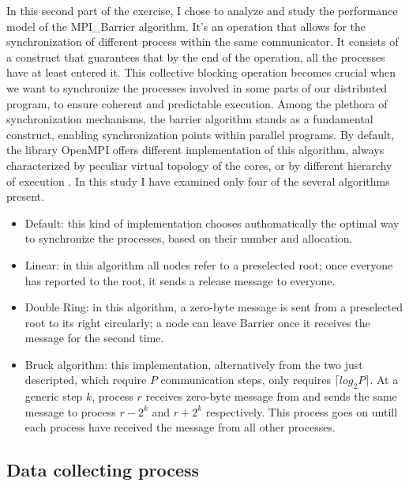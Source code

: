 \documentclass{article}
\begin{document}
	In this second part of the exercise, I chose to analyze and study the performance model of the MPI\_Barrier algorithm. It's an operation that allows for the synchronization of different process within the same communicator. It consists of a construct that guarantees that by the end of the operation, all the processes have at least entered it.
	This collective blocking operation becomes crucial when we want to synchronize the processes involved in some parts of our distributed program, to ensure coherent and predictable execution. Among the plethora of synchronization mechanisms, the barrier algorithm stands as a fundamental construct, enabling synchronization points within parallel programs.
	By default, the library OpenMPI offers different implementation of this algorithm, always characterized by peculiar virtual topology of the cores, or by different hierarchy of execution \cite{barrier_article}. In this study I have examined only four of the  several algorithms present.
	
	\begin{itemize}
		\item Default: this kind of implementation chooses authomatically the optimal way to synchronize the processes, based on their number and allocation.\\
		\item Linear: in this algorithm all nodes refer to a preselected root; once everyone has reported to the root, it sends a release message to everyone.\\
		\item Double Ring: in this algorithm, a zero-byte message is sent from a preselected root to its right circularly; a node can leave Barrier once it receives the message for the second time.\\
		\item Bruck algorithm: this implementation, alternatively from the two just descripted, which require $P$ communication steps, only requires $\lceil log_2P \rceil$. At a generic step $k$, process $r$ receives zero-byte message from and sends the same message to process $r - 2^k$ and $r + 2^k$ respectively. This process goes on untill each process have received the message from all other processes.
	\end{itemize}
	
	\subsection{Data collecting process}
	
\end{document}
